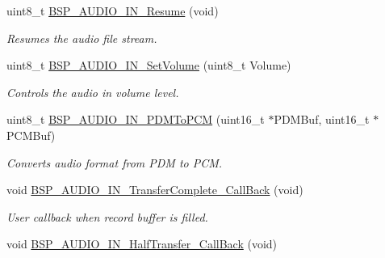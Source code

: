 \begin{DoxyCompactItemize}
uint8\+\_\+t \mbox{\hyperlink{group___s_t_m32_f4___d_i_s_c_o_v_e_r_y___a_u_d_i_o___i_n___exported___functions_gadf7a4308129a18f4a3c22adb6f543d01}{B\+S\+P\+\_\+\+A\+U\+D\+I\+O\+\_\+\+I\+N\+\_\+\+Resume}} (void)
\begin{DoxyCompactList}\small\item\em Resumes the audio file stream. ~\newline
 \end{DoxyCompactList}\item 
uint8\+\_\+t \mbox{\hyperlink{group___s_t_m32_f4___d_i_s_c_o_v_e_r_y___a_u_d_i_o___i_n___exported___functions_gab17acd5b523e9af8ac67271b0b6123ba}{B\+S\+P\+\_\+\+A\+U\+D\+I\+O\+\_\+\+I\+N\+\_\+\+Set\+Volume}} (uint8\+\_\+t Volume)
\begin{DoxyCompactList}\small\item\em Controls the audio in volume level. \end{DoxyCompactList}\item 
uint8\+\_\+t \mbox{\hyperlink{group___s_t_m32_f4___d_i_s_c_o_v_e_r_y___a_u_d_i_o___i_n___exported___functions_ga778fc1e32ffc40c6d779e637a80a7dac}{B\+S\+P\+\_\+\+A\+U\+D\+I\+O\+\_\+\+I\+N\+\_\+\+P\+D\+M\+To\+P\+CM}} (uint16\+\_\+t $\ast$P\+D\+M\+Buf, uint16\+\_\+t $\ast$P\+C\+M\+Buf)
\begin{DoxyCompactList}\small\item\em Converts audio format from P\+DM to P\+CM. \end{DoxyCompactList}\item 
\mbox{\label{group___s_t_m32_f4___d_i_s_c_o_v_e_r_y___a_u_d_i_o___i_n___exported___functions_gaa5cfd402108d9933f0a12beed3863587}} 
void \mbox{\hyperlink{group___s_t_m32_f4___d_i_s_c_o_v_e_r_y___a_u_d_i_o___i_n___exported___functions_gaa5cfd402108d9933f0a12beed3863587}{B\+S\+P\+\_\+\+A\+U\+D\+I\+O\+\_\+\+I\+N\+\_\+\+Transfer\+Complete\+\_\+\+Call\+Back}} (void)
\begin{DoxyCompactList}\small\item\em User callback when record buffer is filled. \end{DoxyCompactList}\item 
\mbox{\label{group___s_t_m32_f4___d_i_s_c_o_v_e_r_y___a_u_d_i_o___i_n___exported___functions_ga90d938ee6930b09a9931738e186bcb4e}} 
void \mbox{\hyperlink{group___s_t_m32_f4___d_i_s_c_o_v_e_r_y___a_u_d_i_o___i_n___exported___functions_ga90d938ee6930b09a9931738e186bcb4e}{B\+S\+P\+\_\+\+A\+U\+D\+I\+O\+\_\+\+I\+N\+\_\+\+Half\+Transfer\+\_\+\+Call\+Back}} (void)

\end{DoxyCompactItemize}
